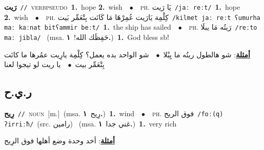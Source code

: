\documentclass[10pt,a4paper,twoside]{article} %
\begin{document}
\begin{multicols}{2}
{\setlength\topsep{0pt}\textbf{\foreignlanguage{arabic}{رَيت}}\ {\color{gray}\texttt{//}\color{black}}\ \textsc{verb\textunderscore pseudo}\ \textbf{1.}~hope  \textbf{2.}~wish\ \ $\bullet$\ \ \textsc{ph.} \color{gray} \foreignlanguage{arabic}{يَا رَيت}\color{black}\ {\color{gray}\texttt{/{\sffamily jaː reːt}/}\color{black}}\ \textbf{1.}~hope  \textbf{2.}~wish\ \ $\bullet$\ \ \textsc{ph.} \color{gray} \foreignlanguage{arabic}{كِلْمِة يَارَيت عُمِرْهَا مَا كَانَت بِتْعَمِّر بَيت}\color{black}\ {\color{gray}\texttt{/{\sffamily kilmet jaː reːt ʕumurha maː kaːnat bitʕammir beːt}/}\color{black}}\ \textbf{1.}~the ship has sailed\ \ $\bullet$\ \ \textsc{ph.} \color{gray} \foreignlanguage{arabic}{رَيتُه مَا يبلَا}\color{black}\ {\color{gray}\texttt{/{\sffamily reːto maː jibla}/}\color{black}}\ \color{gray} (msa. \foreignlanguage{arabic}{حَفِظَك الله!}~\foreignlanguage{arabic}{\textbf{١.}})\color{black}\ \textbf{1.}~God bless sb!\  \begin{flushright}\color{gray}\foreignlanguage{arabic}{\textbf{\underline{\foreignlanguage{arabic}{أمثلة}}}: شو هالطول ريتُه ما يِبْلا\ $\bullet$\ \  شو الواحد بده يعمل؟ كِلْمِة يارِيت عمُرها ما كانَت بِتْعَمِّر بيت\ $\bullet$\ \  يا ريت لو تيجوا لعنا}\end{flushright}\color{black}} \vspace{2mm}

\vspace{-3mm}
\subsection*{\color{blue}\foreignlanguage{arabic}{ر.ي.ح}\color{blue}{}} 

{\setlength\topsep{0pt}\textbf{\foreignlanguage{arabic}{رِيح}}\ {\color{gray}\texttt{//}\color{black}}\ \textsc{noun}\ [m.]\ \color{gray}(msa. \foreignlanguage{arabic}{رِيح}~\foreignlanguage{arabic}{\textbf{١.}})\color{black}\ \textbf{1.}~wind\ \ $\bullet$\ \ \textsc{ph.} \color{gray} \foreignlanguage{arabic}{فوق الريح}\color{black}\ {\color{gray}\texttt{/{\sffamily foː(q) ʔirriːħ}/}\color{black}}\ \color{gray}(src. \foreignlanguage{arabic}{رامين})\color{black}\ \color{gray} (msa. \foreignlanguage{arabic}{غني جدا}~\foreignlanguage{arabic}{\textbf{١.}})\color{black}\ \textbf{1.}~very rich\  \begin{flushright}\color{gray}\foreignlanguage{arabic}{\textbf{\underline{\foreignlanguage{arabic}{أمثلة}}}: أخد وحدة وضع أهلها فوق الرِيح}\end{flushright}\color{black}} \vspace{2mm}


\end{multicols}
\end{document}
